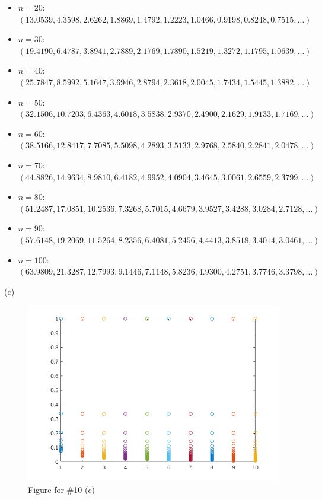 \documentclass{homework}
\begin{document}
{\begin{itemize}
\item $n=20$:
$(13.0539, 4.3598, 2.6262, 1.8869, 1.4792, 1.2223, 1.0466, 0.9198, 0.8248, 0.7515, \dots)$

\item $n=30$:
$(19.4190, 6.4787, 3.8941, 2.7889, 2.1769, 1.7890, 1.5219, 1.3272, 1.1795, 1.0639, \dots)$

\item $n=40$:
$(25.7847, 8.5992, 5.1647, 3.6946, 2.8794, 2.3618, 2.0045, 1.7434, 1.5445, 1.3882, \dots)$

\item $n=50$:
$(32.1506, 10.7203, 6.4363, 4.6018, 3.5838, 2.9370, 2.4900, 2.1629, 1.9133, 1.7169, \dots)$

\item $n=60$:
$(38.5166, 12.8417, 7.7085, 5.5098, 4.2893, 3.5133, 2.9768, 2.5840, 2.2841, 2.0478, \dots)$

\item $n=70$:
$(44.8826, 14.9634, 8.9810, 6.4182, 4.9952, 4.0904, 3.4645, 3.0061, 2.6559, 2.3799, \dots)$

\item $n=80$:
$(51.2487, 17.0851, 10.2536, 7.3268, 5.7015, 4.6679, 3.9527, 3.4288, 3.0284, 2.7128, \dots)$

\item $n=90$:
$(57.6148, 19.2069, 11.5264, 8.2356, 6.4081, 5.2456, 4.4413, 3.8518, 3.4014, 3.0461, \dots)$

\item $n=100$:
$(63.9809, 21.3287, 12.7993, 9.1446, 7.1148, 5.8236, 4.9300, 4.2751, 3.7746, 3.3798, \dots)$
\end{itemize}


\newpage
\noindent(c)
\begin{figure}[ht]
    \centering
    \hspace*{-2cm}\includegraphics{midterm10c.png}    \caption{Figure for \#10 (c)}
\end{figure}

}
\end{document}
